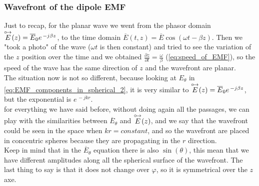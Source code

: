 \subsubsection*{Wavefront of the dipole EMF}
Just to recap, for the planar wave we went from the phasor domain $\overset{\mathbin {{\circ \mkern-2.5mu\rightarrow}}}{E}(z)=\overline{E}_0 e^{\,-j\beta z}$, to the time domain $\overline{E}(t,z)=\overline{E}\cos(\omega t-\beta z)$. Then we "took a photo" of the wave ($\omega t$ is then constant) and tried to see the variation of the $z$ position over the time and we obtained $\frac{\partial z}{\partial t}=\frac{\omega}{\beta}$ (\cref{eq:speed_of_EMF}), so the speed of the wave has the same direction of $z$ and the wavefront are planar.\\
The situation now is not so different, because looking at $E_\theta$ in \cref{eq:EMF_components_in_spherical_2}, it is very similar to $\overset{\mathbin {{\circ \mkern-2.5mu\rightarrow}}}{E}(z)=\overline{E}_0 e^{\,-j\beta z}$, but the exponential is $e^{\,-jkr}$.\\
for everything we have said before, without doing again all the passages, we can play with the similarities between $\overline{E}_\theta$ and $\overset{\mathbin {{\circ \mkern-2.5mu\rightarrow}}}{E}(z)$, and we say that the wavefront could be seen in the space when $kr=constant$, and so the wavefront are placed in concentric spheres because they are propagating in the $r$ direction.\\
Keep in mind that in the $\overline{E}_\theta$ equation there is also $\sin(\theta)$, this mean that we have different amplitudes along all the spherical surface of the wavefront. The last thing to say is that it does not change over $\varphi$, so it is symmetrical over the $z$ axe.

